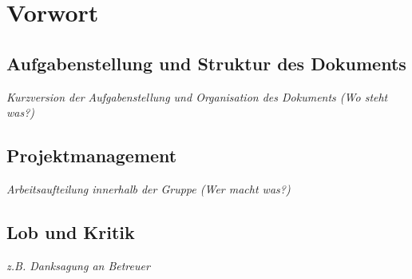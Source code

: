 \chapter{Vorwort}
\label{ch:1}

\section{Aufgabenstellung und Struktur des Dokuments}
\label{sec:1.1}

{\em Kurzversion der Aufgabenstellung und Organisation des Dokuments
(Wo steht was?)}

\section{Projektmanagement}
\label{sec:1.2}

{\em Arbeitsaufteilung innerhalb der Gruppe (Wer macht was?)}

\section{Lob und Kritik}
\label{sec:1.3}

{\em z.B. Danksagung an Betreuer}

